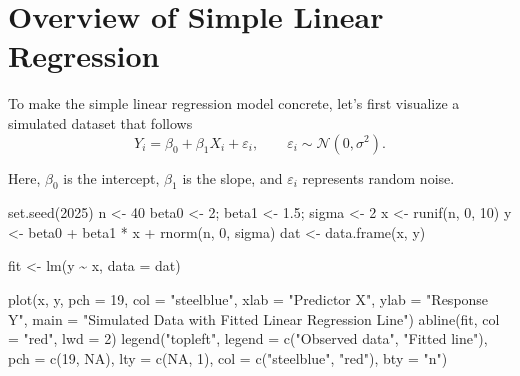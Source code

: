 \documentclass[
  letterpaper,
  DIV=11,
  numbers=noendperiod]{scrreprt}
\newenvironment{Shaded}{\begin{snugshade}}{\end{snugshade}}
\newcommand{\AttributeTok}[1]{\textcolor[rgb]{0.40,0.45,0.13}{#1}}
\newcommand{\ConstantTok}[1]{\textcolor[rgb]{0.56,0.35,0.01}{#1}}
\newcommand{\DecValTok}[1]{\textcolor[rgb]{0.68,0.00,0.00}{#1}}
\newcommand{\FloatTok}[1]{\textcolor[rgb]{0.68,0.00,0.00}{#1}}
\newcommand{\FunctionTok}[1]{\textcolor[rgb]{0.28,0.35,0.67}{#1}}
\newcommand{\NormalTok}[1]{\textcolor[rgb]{0.00,0.23,0.31}{#1}}
\newcommand{\OtherTok}[1]{\textcolor[rgb]{0.00,0.23,0.31}{#1}}
\newcommand{\SpecialCharTok}[1]{\textcolor[rgb]{0.37,0.37,0.37}{#1}}
\newcommand{\StringTok}[1]{\textcolor[rgb]{0.13,0.47,0.30}{#1}}
\begin{document}
\section{Overview of Simple Linear
Regression}\label{overview-of-simple-linear-regression}

To make the simple linear regression model concrete, let's first
visualize a simulated dataset that follows \[
Y_i = \beta_0 + \beta_1 X_i + \varepsilon_i, \qquad
\varepsilon_i \sim \mathcal N(0, \sigma^2).
\]

Here, \(\beta_0\) is the intercept, \(\beta_1\) is the slope, and
\(\varepsilon_i\) represents random noise.

\begin{Shaded}
\begin{Highlighting}[]
\FunctionTok{set.seed}\NormalTok{(}\DecValTok{2025}\NormalTok{)}
\NormalTok{n }\OtherTok{\textless{}{-}} \DecValTok{40}
\NormalTok{beta0 }\OtherTok{\textless{}{-}} \DecValTok{2}\NormalTok{; beta1 }\OtherTok{\textless{}{-}} \FloatTok{1.5}\NormalTok{; sigma }\OtherTok{\textless{}{-}} \DecValTok{2}
\NormalTok{x }\OtherTok{\textless{}{-}} \FunctionTok{runif}\NormalTok{(n, }\DecValTok{0}\NormalTok{, }\DecValTok{10}\NormalTok{)}
\NormalTok{y }\OtherTok{\textless{}{-}}\NormalTok{ beta0 }\SpecialCharTok{+}\NormalTok{ beta1 }\SpecialCharTok{*}\NormalTok{ x }\SpecialCharTok{+} \FunctionTok{rnorm}\NormalTok{(n, }\DecValTok{0}\NormalTok{, sigma)}
\NormalTok{dat }\OtherTok{\textless{}{-}} \FunctionTok{data.frame}\NormalTok{(x, y)}

\NormalTok{fit }\OtherTok{\textless{}{-}} \FunctionTok{lm}\NormalTok{(y }\SpecialCharTok{\textasciitilde{}}\NormalTok{ x, }\AttributeTok{data =}\NormalTok{ dat)}

\FunctionTok{plot}\NormalTok{(x, y, }\AttributeTok{pch =} \DecValTok{19}\NormalTok{, }\AttributeTok{col =} \StringTok{"steelblue"}\NormalTok{,}
     \AttributeTok{xlab =} \StringTok{"Predictor X"}\NormalTok{, }\AttributeTok{ylab =} \StringTok{"Response Y"}\NormalTok{,}
     \AttributeTok{main =} \StringTok{"Simulated Data with Fitted Linear Regression Line"}\NormalTok{)}
\FunctionTok{abline}\NormalTok{(fit, }\AttributeTok{col =} \StringTok{"red"}\NormalTok{, }\AttributeTok{lwd =} \DecValTok{2}\NormalTok{)}
\FunctionTok{legend}\NormalTok{(}\StringTok{"topleft"}\NormalTok{, }\AttributeTok{legend =} \FunctionTok{c}\NormalTok{(}\StringTok{"Observed data"}\NormalTok{, }\StringTok{"Fitted line"}\NormalTok{),}
       \AttributeTok{pch =} \FunctionTok{c}\NormalTok{(}\DecValTok{19}\NormalTok{, }\ConstantTok{NA}\NormalTok{), }\AttributeTok{lty =} \FunctionTok{c}\NormalTok{(}\ConstantTok{NA}\NormalTok{, }\DecValTok{1}\NormalTok{), }\AttributeTok{col =} \FunctionTok{c}\NormalTok{(}\StringTok{"steelblue"}\NormalTok{, }\StringTok{"red"}\NormalTok{), }\AttributeTok{bty =} \StringTok{"n"}\NormalTok{)}
\end{Highlighting}
\end{Shaded}
\end{document}
